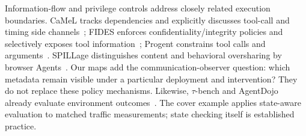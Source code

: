 Information-flow and privilege controls address closely related execution boundaries. CaMeL tracks dependencies and explicitly discusses tool-call and timing side channels~\cite{debenedetti2025camel}; FIDES enforces confidentiality/integrity policies and selectively exposes tool information~\cite{costa2025fides}; Progent constrains tool calls and arguments~\cite{shi2025progent}. SPILLage distinguishes content and behavioral oversharing by browser Agents~\cite{roh2026spillage}. Our maps add the communication-observer question: which metadata remain visible under a particular deployment and intervention? They do not replace these policy mechanisms. Likewise, $\tau$-bench and AgentDojo already evaluate environment outcomes~\cite{yao2024taubench,debenedetti2024agentdojo}. The cover example applies state-aware evaluation to matched traffic measurements; state checking itself is established practice.
